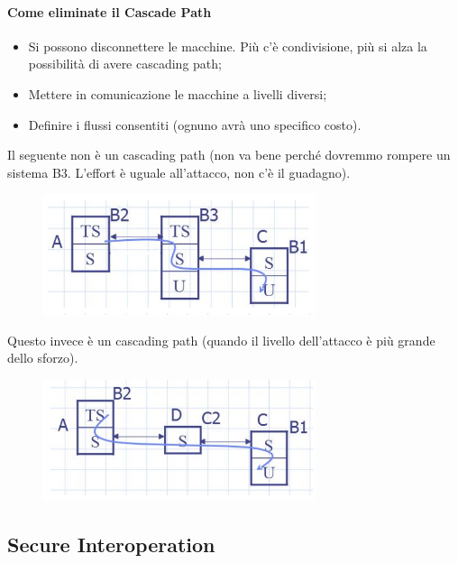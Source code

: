 \paragraph{Come eliminate il Cascade Path}
\begin{itemize}
      \item  Si possono disconnettere le macchine. Più c’è condivisione,
            più si alza la possibilità di
            avere cascading path;
      \item  Mettere in comunicazione le macchine a livelli diversi;
      \item  Definire i flussi consentiti (ognuno avrà uno specifico costo).
\end{itemize}
Il seguente non è un cascading path (non va bene perché dovremmo
rompere un sistema B3. L’effort è uguale all’attacco, non c’è il
guadagno).
\begin{figure}[H]
      \centering
      \includegraphics[width=8cm, keepaspectratio]{capitoli/policy/imgs/cascade3.png}
\end{figure}
Questo invece è un cascading path (quando il livello dell’attacco è più
grande dello sforzo).
\begin{figure}[H]
      \centering
      \includegraphics[width=8cm, keepaspectratio]{capitoli/policy/imgs/cascade2.png}
\end{figure}

\subsection{Secure Interoperation}